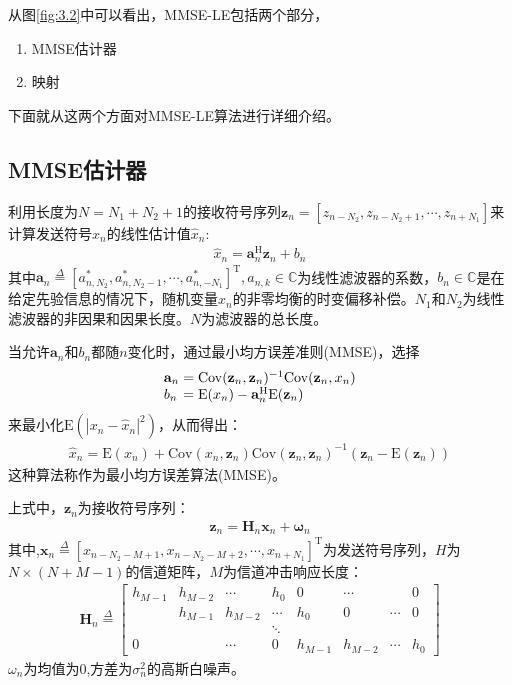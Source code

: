 从图\ref{fig:3.2}中可以看出，MMSE-LE包括两个部分，
\begin{enumerate}
    \item MMSE估计器
    \item 映射
\end{enumerate}
下面就从这两个方面对MMSE-LE算法进行详细介绍。
\subsection{MMSE估计器}
利用长度为$N=N_1+N_2+1$的接收符号序列$\mathbf{z}_n=[z_{n-N_2},z_{n-N_2+1},\cdots,z_{n+N_1}]$来计算发送符号$x_n$的线性估计值$\hat{x}_n$:
\begin{eqnarray}
    \hat{x}_n=\mathbf{a}_n^{\mathrm{H}}\mathbf{z}_n+b_n
    \label{equ:3.1}
\end{eqnarray}
其中$\mathbf{a}_n\overset{\Delta}{=}[a_{n,N_2}^*,a_{n,N_2-1}^*,\cdots,a_{n,-N_1}^*]^{\mathrm{T}},a_{n,k}\in
\mathbb{C}$为线性滤波器的系数，$b_n\in
\mathbb{C}$是在给定先验信息的情况下，随机变量$x_n$的非零均衡的时变偏移补偿。$N_1$和$N_2$为线性滤波器的非因果和因果长度。$N$为滤波器的总长度。

当允许$\mathbf{a}_n$和$b_n$都随$n$变化时，通过最小均方误差准则(MMSE)，选择
\begin{eqnarray}
    \begin{array}{l@{\;=\;}l}
        \mathbf{a}_n&\mathrm{Cov}(\mathbf{z}_n,\mathbf{z}_n)^{-1}\mathrm{Cov}(\mathbf{z}_n,x_n)\\   
        b_n&\mathrm{E}(x_n)-\mathbf{a}_n^{\mathrm{H}}\mathrm{E}(\mathbf{z}_n)
    \end{array}
    \label{equ:3.2}
\end{eqnarray}
来最小化$\mathrm{E}(|x_n-\hat{x}_n|^2)$，从而得出：
\begin{eqnarray}
    \hat{x}_n=\mathrm{E}(x_n)+\mathrm{Cov}(x_n,\mathbf{z}_n)\mathrm{Cov}(\mathbf{z}_n,\mathbf{z}_n)^{-1}(\mathbf{z}_n-\mathrm{E}(\mathbf{z}_n))
    \label{equ:3.3}
\end{eqnarray}
这种算法称作为最小均方误差算法(MMSE)。

上式中，$\mathbf{z}_n$为接收符号序列：
\begin{eqnarray}
    \mathbf{z}_n=\mathbf{H}_n\mathbf{x}_n+\boldsymbol{\omega}_n
    \label{equ:3.4}
\end{eqnarray}
其中,$\mathbf{x}_n\overset{\Delta}{=}[x_{n-N_2-M+1},x_{n-N_2-M+2},\cdots,x_{n+N_1}]^{\mathrm{T}}$为发送符号序列，$H$为$N\times
(N+M-1)$的信道矩阵，$M$为信道冲击响应长度：
\begin{eqnarray}
\mathbf{H}_n\overset{\Delta}{=}\begin{bmatrix}
 h_{M-1}&h_{M-2}  &\cdots  & h_0 & 0 & \cdots &  &0 \\ 
 &h_{M-1}  & h_{M-2} & \cdots & h_0 & 0 & \cdots &0 \\ 
 &  &  &  \ddots&  &  &  & \\ 
 0&  & \cdots & 0 & h_{M-1} &h_{M-2}  &\cdots  & h_0
\end{bmatrix}    
    \label{equ:3.5}
\end{eqnarray}
$\omega_n$为均值为$0$,方差为$\sigma_n^2$的高斯白噪声。

